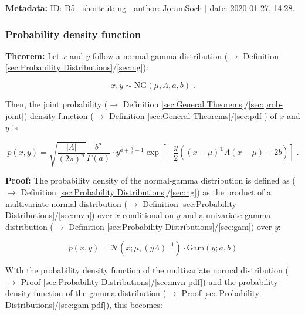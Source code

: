 \documentclass[a4paper,12pt,twoside]{book}
\begin{document}
\vspace{1em}
\textbf{Metadata:} ID: D5 | shortcut: ng | author: JoramSoch | date: 2020-01-27, 14:28.
\vspace{1em}



\subsubsection[\textbf{Probability density function}]{Probability density function} \label{sec:ng-pdf}
\setcounter{equation}{0}

\textbf{Theorem:} Let $x$ and $y$ follow a normal-gamma distribution ($\rightarrow$ Definition \ref{sec:Probability Distributions}/\ref{sec:ng}):

\begin{equation} \label{eq:ng-pdf-ng}
x,y \sim \mathrm{NG}(\mu, \Lambda, a, b) \; .
\end{equation}

Then, the joint probability ($\rightarrow$ Definition \ref{sec:General Theorems}/\ref{sec:prob-joint}) density function ($\rightarrow$ Definition \ref{sec:General Theorems}/\ref{sec:pdf}) of $x$ and $y$ is

\begin{equation} \label{eq:ng-pdf-ng-pdf}
p(x,y) = \sqrt{\frac{|\Lambda|}{(2 \pi)^n}} \frac{b^a}{\Gamma(a)} \cdot y^{a+\frac{n}{2}-1} \exp \left[ -\frac{y}{2} \left( (x-\mu)^\mathrm{T} \Lambda (x-\mu) + 2b \right) \right] \; .
\end{equation}


\vspace{1em}
\textbf{Proof:} The probability density of the normal-gamma distribution is defined as ($\rightarrow$ Definition \ref{sec:Probability Distributions}/\ref{sec:ng}) as the product of a multivariate normal distribution ($\rightarrow$ Definition \ref{sec:Probability Distributions}/\ref{sec:mvn}) over $x$ conditional on $y$ and a univariate gamma distribution ($\rightarrow$ Definition \ref{sec:Probability Distributions}/\ref{sec:gam}) over $y$:

\begin{equation} \label{eq:ng-pdf-ng-pdf-w1}
p(x,y) = \mathcal{N}(x; \mu, (y \Lambda)^{-1}) \cdot \mathrm{Gam}(y; a, b)
\end{equation}

With the probability density function of the multivariate normal distribution ($\rightarrow$ Proof \ref{sec:Probability Distributions}/\ref{sec:mvn-pdf}) and the probability density function of the gamma distribution ($\rightarrow$ Proof \ref{sec:Probability Distributions}/\ref{sec:gam-pdf}), this becomes:
\end{document}
